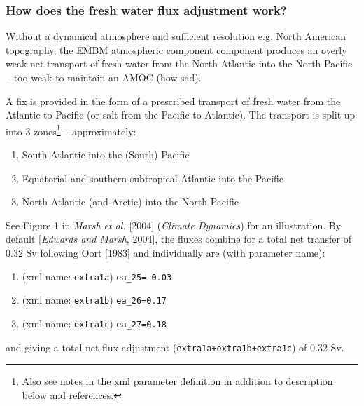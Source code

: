 \documentclass[11pt,fleqn]{book} %
\begin{document}
%
\subsubsection{How does the fresh water flux adjustment work?}

Without a dynamical atmosphere and sufficient resolution e.g. North American topography, the EMBM atmospheric component component produces an overly weak net transport of fresh water from the North Atlantic into the North Pacific -- too weak to maintain an AMOC (how sad).

A fix is provided in the form of a prescribed transport of fresh water from the Atlantic to Pacific (or salt from the Pacific to Atlantic). The transport is split up into 3 zones\footnote{Also see notes in the xml parameter definition in addition to description below and references.} -- approximately:

\vspace{1mm}
\begin{enumerate}[noitemsep]
\item South Atlantic into the (South) Pacific
\\\noindent [latitude band \texttt{j=9,12} (\texttt{36x36} grid)]
\item Equatorial and southern subtropical Atlantic into the Pacific
\\\noindent [latitude band \texttt{j=13,25} (\texttt{36x36} grid)]
\item North Atlantic (and Arctic) into the North Pacific
\\\noindent [latitude band \texttt{j=26,36} (\texttt{36x36} grid)]
\end{enumerate}
\vspace{1mm}
See Figure 1 in \textit{Marsh et al.} [2004] (\textit{Climate Dynamics}) for an illustration. By default [\textit{Edwards and Marsh}, 2004], the fluxes combine for a total net transfer of 0.32 Sv following Oort [1983] and individually are (with parameter name):
\vspace{1mm}
\begin{enumerate}[noitemsep]
\item (xml name: \texttt{extra1a}) \texttt{ea\_25=-0.03}
\item (xml name: \texttt{extra1b}) \texttt{ea\_26=0.17}
\item (xml name: \texttt{extra1c}) \texttt{ea\_27=0.18}
\end{enumerate}
\vspace{1mm}
and giving a total net flux adjustment (\texttt{extra1a+extra1b+extra1c}) of 0.32 Sv.
\end{document}
